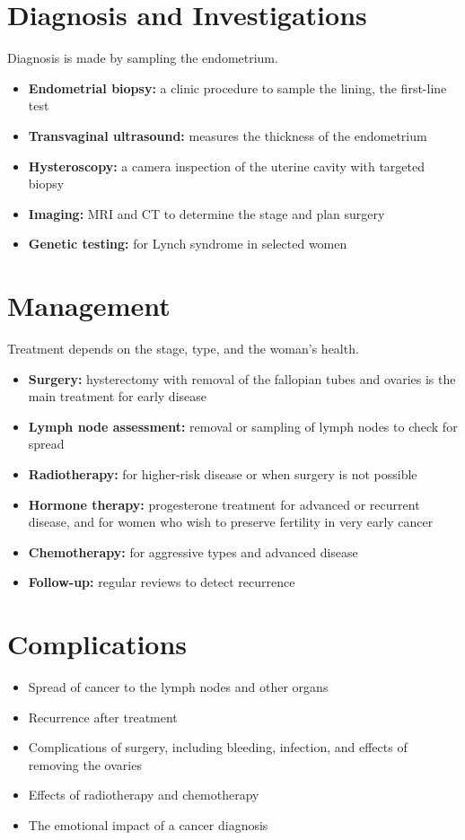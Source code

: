 \section*{Diagnosis and Investigations}
Diagnosis is made by sampling the endometrium.
\begin{itemize}
    \item \textbf{Endometrial biopsy:} a clinic procedure to sample the lining, the first-line test
    \item \textbf{Transvaginal ultrasound:} measures the thickness of the endometrium
    \item \textbf{Hysteroscopy:} a camera inspection of the uterine cavity with targeted biopsy
    \item \textbf{Imaging:} MRI and CT to determine the stage and plan surgery
    \item \textbf{Genetic testing:} for Lynch syndrome in selected women
\end{itemize}

\section*{Management}
Treatment depends on the stage, type, and the woman's health.
\begin{itemize}
    \item \textbf{Surgery:} hysterectomy with removal of the fallopian tubes and ovaries is the main treatment for early disease
    \item \textbf{Lymph node assessment:} removal or sampling of lymph nodes to check for spread
    \item \textbf{Radiotherapy:} for higher-risk disease or when surgery is not possible
    \item \textbf{Hormone therapy:} progesterone treatment for advanced or recurrent disease, and for women who wish to preserve fertility in very early cancer
    \item \textbf{Chemotherapy:} for aggressive types and advanced disease
    \item \textbf{Follow-up:} regular reviews to detect recurrence
\end{itemize}

\section*{Complications}
\begin{itemize}
    \item Spread of cancer to the lymph nodes and other organs
    \item Recurrence after treatment
    \item Complications of surgery, including bleeding, infection, and effects of removing the ovaries
    \item Effects of radiotherapy and chemotherapy
    \item The emotional impact of a cancer diagnosis
\end{itemize}

